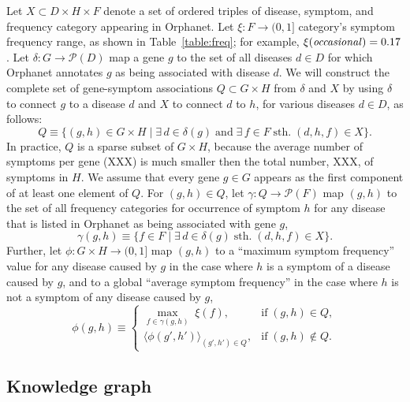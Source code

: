 \documentclass[11pt,notitlepage,english]{article}
\begin{document}
Let $X \subset D \times H \times F$ denote a set of ordered triples of disease,
symptom, and frequency category appearing in Orphanet. Let $\xi: F \rightarrow
(0,1]$ %
  category's symptom frequency range, as shown in Table~\ref{table:freq}; for
  example, $\xi(\textrm{\em occasional\/}) = 0.17$.  Let $\delta: G \rightarrow
  {\mathcal P}(D)$ map a gene $g$ to the set of all diseases $d \in D$ for which
  Orphanet annotates $g$ as being associated with disease $d$.  We will construct
  the complete set of gene-symptom associations $Q \subset G \times H$ from
  $\delta$ and $X$ by using $\delta$ to connect $g$ to a disease $d$ and $X$ to
  connect $d$ to $h$, for various diseases $d \in D$, as follows:
\begin{equation}
  Q \equiv \{(g,h) \in G\times H \; | \; \exists \, d \in \delta(g) \; \textrm{and} \;
    \exists \, f \in F 
\;    \textrm{sth.} \; (d,h,f) \in X\}.
\end{equation}
In practice, $Q$ is a sparse subset of $G \times H$, because the average number of symptoms per gene (XXX) is much smaller
then the total number, XXX, of symptoms in $H$.  We
assume that every gene $g \in G$ appears as the first component of at
least one element of $Q$. For $(g, h) \in Q$, let $\gamma:
Q \rightarrow {\mathcal P}(F)$ map $(g, h)$ to the set of
all frequency categories for occurrence of symptom $h$ for any disease that is
listed in Orphanet as being associated with gene $g$,
\begin{equation}
\gamma(g,h) \equiv \{ f \in F \; | \; \exists \, d \in \delta(g) \; \textrm{sth.} \; (d, h, f) \in X\}.
\end{equation}
Further, let
$\phi: G \times H \rightarrow (0,1]$ %
map
$(g,h)$ to a ``maximum symptom frequency'' value for any disease caused by $g$ in
the case where $h$ is a symptom of a disease caused by $g$,
and to a global ``average symptom frequency'' in the case where
$h$ is not a symptom of any disease caused by $g$,
\begin{equation}
  \phi(g,h) \equiv
  \begin{cases}
    \underset{f \in \gamma(g, h)}{\max} \; \xi(f),
    & \textrm{if} \; (g,h) \in Q, \\
    \langle \phi(g',h') \rangle_{(g',h') \in Q}, & \textrm{if} \;
    (g,h) \not\in Q.
  \end{cases}
  \label{eq:psi}
\end{equation}

\subsection{Knowledge graph}
\end{document}

